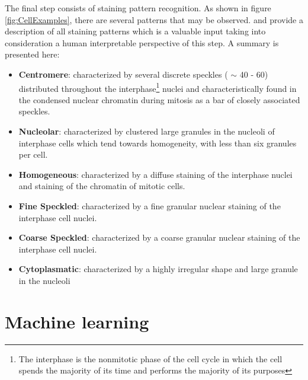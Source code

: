 The final step consists of staining pattern recognition. As shown in figure \ref{fig:CellExamples}, there are several patterns that may be observed. \cite{FoggiaBenchmarks2013} and \cite{Perner02miningknowledge} provide a description of all staining patterns which is a valuable input taking into consideration a human interpretable perspective of this step. A summary is presented here:
\begin{itemize}

	\item \textbf{Centromere}: characterized by several discrete speckles ( $\sim$ 40 - 60) distributed throughout the interphase\footnote{The interphase is the nonmitotic phase of the cell cycle in which the cell spends the majority of its time and performs the majority of its purposes} nuclei and characteristically found in the condensed nuclear chromatin during mitosis as a bar of closely associated speckles.
	
	\item \textbf{Nucleolar}: characterized by clustered large granules in
the nucleoli of interphase cells which tend towards homogeneity, with less than six granules per cell.

	\item \textbf{Homogeneous}: characterized by a diffuse staining of the interphase nuclei and staining of the chromatin of mitotic cells.
	
	\item \textbf{Fine Speckled}: characterized by a fine granular nuclear staining of the interphase cell nuclei.
	
	\item \textbf{Coarse Speckled}: characterized by a coarse granular nuclear staining of the interphase cell nuclei.
	
	\item \textbf{Cytoplasmatic}: characterized by a highly irregular shape and large granule in the nucleoli

\end{itemize}



\section{Machine learning}